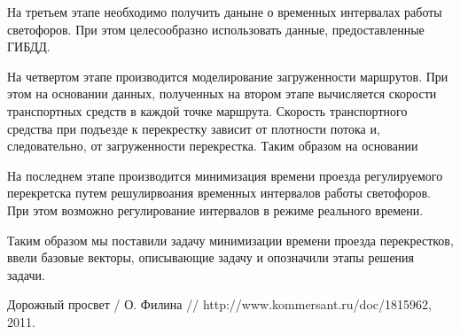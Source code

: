 \documentclass[a4paper,13pt]{article}
\begin{document}
На третьем этапе необходимо получить даныне о временных интервалах работы светофоров. При этом целесообразно использовать данные, предоставленные ГИБДД.

На четвертом этапе производится моделирование загруженности маршрутов. При этом на основании данных, полученных на втором этапе вычисляется скорости транспортных средств в каждой точке маршрута. Скорость транспортного средства при подъезде к перекрестку зависит от плотности потока и, следовательно, от загруженности перекрестка. Таким образом на основании 

На последнем этапе производится минимизация времени проезда регулируемого перекретска путем решулирвоания временных интервалов работы светофоров. При этом возможно регулирование интервалов в режиме реального времени.

Таким образом мы поставили задачу минимизации времени проезда перекрестков, ввели базовые векторы, описывающие задачу и опозначили этапы решения задачи.

\begin{thebibliography}{1}
Дорожный просвет / О. Филина // http://www.kommersant.ru/doc/1815962, 2011.
\end{thebibliography}
\end{document}
